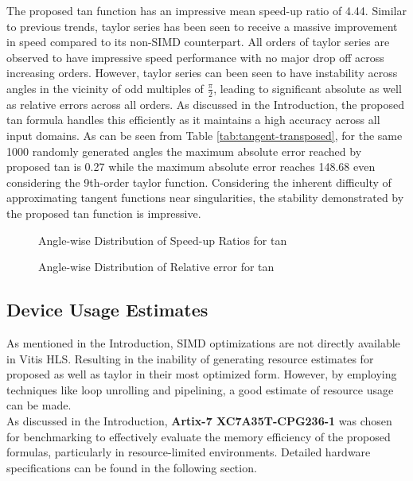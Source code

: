 \documentclass[12pt,twoside, letterpaper, margin=1in]{article}
\begin{document}
The proposed tan function has an impressive mean speed-up ratio of 4.44. Similar to previous trends, taylor series has been seen to receive a massive improvement in speed compared to its non-SIMD counterpart. All orders of taylor series are observed to have impressive speed performance with no major drop off across increasing orders. However, taylor series can been seen to have instability across angles in the vicinity of odd multiples of $\frac{\pi}{2}$, leading to significant absolute as well as relative errors across all orders. As discussed in the Introduction, the proposed tan formula handles this efficiently as it maintains a high accuracy across all input domains. As can be seen from Table \ref{tab:tangent-transposed}, for the same 1000 randomly generated angles the maximum absolute error reached by proposed tan is 0.27 while the maximum absolute error reaches 148.68 even considering the 9th-order taylor function. Considering the inherent difficulty of approximating tangent functions near singularities, the stability demonstrated by the proposed tan function is impressive.



\begin{figure}[H]
    \centering
    \hfill
    \caption{Angle-wise Distribution of Speed-up Ratios for tan}
    \label{speed_up_ratio_tan}
\end{figure}


\begin{figure}[H]
    \centering
    \hfill
    \caption{Angle-wise Distribution of Relative error for tan}
    \label{rel_error_tan}
\end{figure}




\subsection{Device Usage Estimates}
As mentioned in the Introduction, SIMD optimizations are not directly available in Vitis HLS. Resulting in the inability of generating resource estimates for proposed as well as taylor in their most optimized form. However, by employing techniques like loop unrolling and pipelining, a good estimate of resource usage can be made.\\
As discussed in the Introduction, \textbf{Artix-7 XC7A35T-CPG236-1} was chosen for benchmarking to effectively evaluate the memory efficiency of the proposed formulas, particularly in resource-limited environments. Detailed hardware specifications can be found in the following section.
\end{document}

